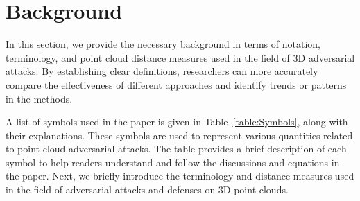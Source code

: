 \documentclass{ieeeaccess}
\begin{document}


\section{Background}
\label{sec:Backgrounds}
In this section, we provide the necessary background in terms of notation, terminology, and point cloud distance measures used in the field of 3D adversarial attacks. By establishing clear definitions, researchers can more accurately compare the effectiveness of different approaches and identify trends or patterns in the methods. 

A list of symbols used in the paper is given in Table~\ref{table:Symbols}, along with their explanations. These symbols are used to represent various quantities related to point cloud adversarial attacks. The table provides a brief description of each symbol to help readers understand and follow the discussions and %
equations in the paper. Next, we briefly introduce the terminology and distance measures used in the field of adversarial attacks and defenses on 3D point clouds. 



\end{document}
